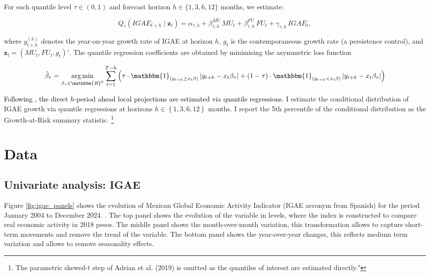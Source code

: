 \documentclass[12pt]{article}
\DeclareMathOperator*{\argmin}{arg\,min}
\begin{document}
For each quantile level $\tau \in (0,1)$ and forecast horizon 
$h \in \{1, 3, 6, 12\}$ months, we estimate:

\begin{equation}\label{eq:gar}
  Q_\tau\!\left( IGAE_{t+h} \mid \mathbf{z}_t \right)
  = \alpha_{\tau,h}
  + \beta^{MU}_{\tau,h}\, MU_t
  + \beta^{FU}_{\tau,h}\, FU_t
  + \gamma_{\tau,h}\, IGAE_t,
\end{equation}

\noindent where $g_{t+h}^{(h)}$ denotes the year-on-year growth rate of 
IGAE at horizon $h$, $g_t$ is the contemporaneous growth rate (a 
persistence control), and $\mathbf{z}_t = (MU_t, FU_t, g_t)'$. The 
quantile regression coefficients are obtained by minimising the 
asymmetric loss function

\begin{equation}
    \hat{\beta}_{\tau} = \underset{\beta_{\tau} \in \mathbbm{R}^{k}}{\argmin}
    \sum_{t=1}^{T-h} \left(
    \tau \cdot \mathbbm{1}_{(y_{t+h} \geq x_t \beta)}
    \left| y_{t+h} - x_t \beta_{\tau} \right|
    +
    (1 - \tau) \cdot \mathbbm{1}_{(y_{t+h} < x_t \beta)}
    \left| y_{t+h} - x_t \beta_{\tau} \right|
    \right)
\end{equation}



\textcolor{black}{Following \cite{adrian2019vulnerable}, the direct $h$-period ahead local projections are estimated via quantile regressions.} I estimate the conditional distribution of IGAE growth via quantile regressions at horizons $h \in \left\lbrace 1, 3, 6, 12 \right\rbrace $ months. I report the 5th percentile of the conditional distribution as the Growth-at-Risk summary statistic. \footnote{The parametric skewed-$t$ step of Adrian et al. (2019) is omitted as the quantiles of interest are estimated directly."}



\section{Data}
\subsection{Univariate analysis: IGAE}\label{sec:univariate}

Figure \ref{fig:igae_panels} shows the evolution of Mexican Global Economic Activity Indicator (IGAE acronym from Spanish) for the period January 2004 to December 2024. \cite{inegi_gdp_quarterly_2026}.  The top panel shows the evolution of the variable in levels, where the index is constructed to compare real economic activity in 2018 pesos. 
The middle panel shows the month-over-month variation, this transformation allows to capture short-term movements and remove the trend of the variable. The bottom panel shows the year-over-year changes, this reflects medium term variation and allows to remove seasonality effects.
\end{document}
